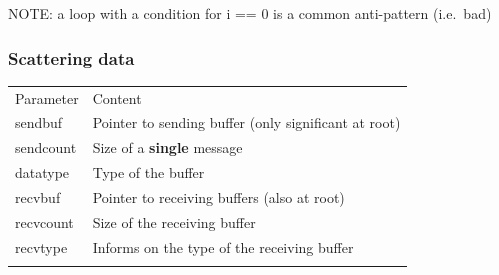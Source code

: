 \begin{Shaded}
\begin{Highlighting}[]
 \NormalTok{;}
 \NormalTok{(} 
      \NormalTok{) \{ } \NormalTok{\}}
       \NormalTok{\}}
      \NormalTok{\}}
\NormalTok{\}}
\end{Highlighting}
\end{Shaded}

NOTE: a loop with a condition for i == 0 is a common anti-pattern
(i.e.~bad)

\subsubsection{Scattering data}\label{scattering-data}

\begin{Shaded}
\begin{Highlighting}[]
    
                  
\end{Highlighting}
\end{Shaded}

\begin{longtable}[c]{@{}ll@{}}
\toprule\addlinespace
Parameter & Content
\\\addlinespace
\midrule\endhead
sendbuf & Pointer to sending buffer (only significant at root)
\\\addlinespace
sendcount & Size of a \textbf{single} message
\\\addlinespace
datatype & Type of the buffer
\\\addlinespace
recvbuf & Pointer to receiving buffers (also at root)
\\\addlinespace
recvcount & Size of the receiving buffer
\\\addlinespace
recvtype & Informs on the type of the receiving buffer
\\\addlinespace
\bottomrule
\end{longtable}

